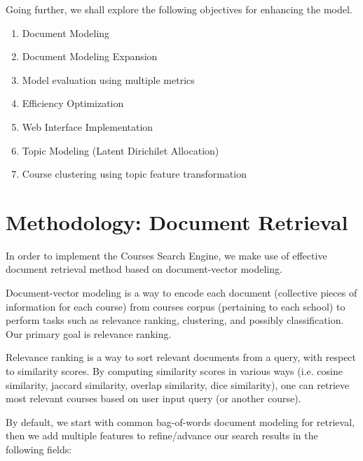 \documentclass[twoside]{article}
\begin{document}
Going further, we shall explore the following objectives for enhancing the model.

\begin{enumerate}
\item Document Modeling
\item Document Modeling Expansion
\item Model evaluation using multiple metrics
\item Efficiency Optimization
\item Web Interface Implementation
\item Topic Modeling (Latent Dirichilet Allocation) 
\item Course clustering using topic feature transformation
\end{enumerate}

\section{Methodology: Document Retrieval}

In order to implement the Courses Search Engine, we make use of effective document retrieval method based on document-vector modeling.

Document-vector modeling is a way to encode each document (collective pieces of information for each course) from courses corpus (pertaining to each school) to perform tasks such as relevance ranking, clustering, and possibly classification. Our primary goal is relevance ranking. 

Relevance ranking is a way to sort relevant documents from a query, with respect to similarity scores. By computing similarity scores in various ways (i.e. cosine similarity, jaccard similarity, overlap similarity, dice similarity), one can retrieve most relevant courses based on user input query (or another course).

By default, we start with common bag-of-words document modeling for retrieval, then we add multiple features to refine/advance our search results in the following fields:
\end{document}
